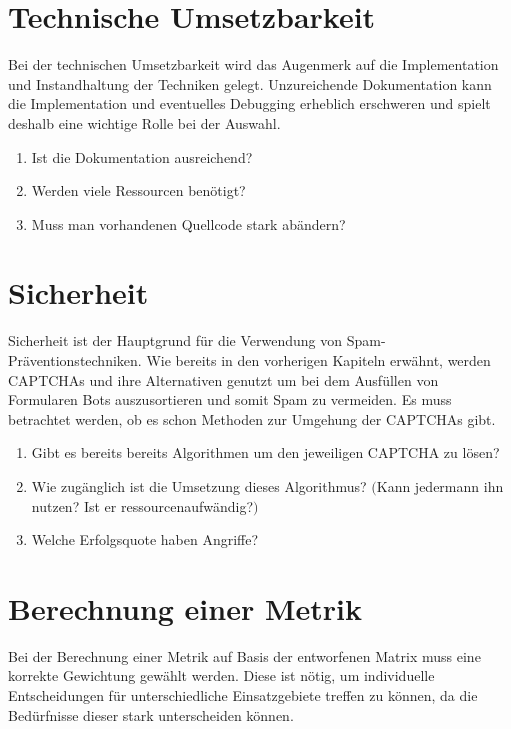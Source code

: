 \section{Technische Umsetzbarkeit}
\label{ch:matrix:tu}

Bei der technischen Umsetzbarkeit wird das Augenmerk auf die Implementation und Instandhaltung der Techniken gelegt.
Unzureichende Dokumentation kann die Implementation und eventuelles Debugging erheblich erschweren
und spielt deshalb eine wichtige Rolle bei der Auswahl.

\begin{enumerate}
    \item Ist die Dokumentation ausreichend? 
    \item Werden viele Ressourcen benötigt?
    \item Muss man vorhandenen Quellcode stark abändern?
\end{enumerate}
 
\section{Sicherheit}
\label{ch:matrix:sicherheit}
Sicherheit ist der Hauptgrund für die Verwendung von Spam-Präventions\-techniken.
Wie bereits in den vorherigen Kapiteln erwähnt, werden CAPTCHAs und ihre Alternativen genutzt um bei dem Ausfüllen von Formularen Bots auszusortieren
und somit Spam zu vermeiden.
Es muss betrachtet werden, ob es schon Methoden zur Umgehung der CAPTCHAs gibt.
\begin{enumerate}
    \item Gibt es bereits bereits Algorithmen um den jeweiligen CAPTCHA zu lösen?
    \item Wie zugänglich ist die Umsetzung dieses Algorithmus? $($Kann jedermann ihn nutzen? Ist er ressourcenaufwändig?$)$
    \item Welche Erfolgsquote haben Angriffe?
\end{enumerate}

\section{Berechnung einer Metrik}
\label{ch:matrix:berechnung}
Bei der Berechnung einer Metrik auf Basis der entworfenen Matrix muss eine korrekte Gewichtung gewählt werden.
Diese ist nötig, um individuelle Entscheidungen für unterschiedliche Einsatzgebiete treffen zu können,
da die Bedürfnisse dieser stark unterscheiden können.

